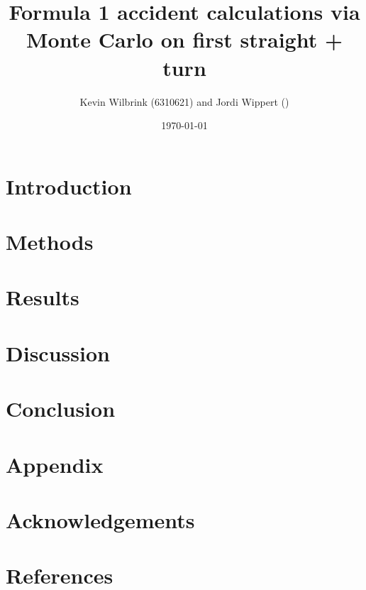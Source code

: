 \documentclass[12pt]{article}
\title{\textbf{Formula 1 accident calculations via Monte Carlo on first straight + turn}}
\date{\today}
\author{Kevin Wilbrink (6310621) and Jordi Wippert ()}
\begin{document}
	\maketitle

	\begin{multicols*}{2}
		\begin{abstract}
			\textbf{}
		\end{abstract}
		

		\section{Introduction}
		

		\section{Methods}
		

		\section{Results}
		

		\section{Discussion}
		

		\section{Conclusion}
		

		\section*{Appendix}
		

		\section*{Acknowledgements}
		

		\section*{References}
		
	\end{multicols*}
\end{document}
